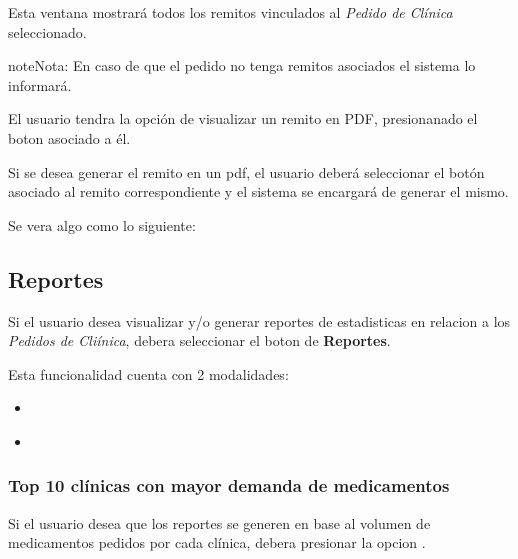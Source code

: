 \documentclass[a4paper,10pt,spanish]{sphinxmanual}
\begin{document}
Esta ventana mostrará todos los remitos vinculados al \emph{Pedido de Clínica} seleccionado.

\begin{notice}{note}{Nota:}
En caso de que el pedido no tenga remitos asociados el sistema lo informará.
\end{notice}

El usuario tendra la opción de visualizar un remito en PDF, presionanado el boton  asociado a él.

Si se desea generar el remito en un pdf, el usuario deberá seleccionar el botón asociado al remito correspondiente y el sistema se encargará de generar el mismo.

Se vera algo como lo siguiente:



\subsection{Reportes}
\label{pedidosclinica:reportes}\label{pedidosclinica:reportes-pc}
Si el usuario desea visualizar y/o generar reportes de estadisticas en relacion a los \emph{Pedidos de Cliínica}, debera seleccionar el boton de \textbf{Reportes}.


Esta funcionalidad cuenta con 2 modalidades:
\begin{itemize}
\item {} 
{\hyperref[pedidosclinica:top10\string-meds\string-pc]{}}

\item {} 
{\hyperref[pedidosclinica:top10\string-peds\string-pc]{}}

\end{itemize}


\subsubsection{Top 10 clínicas con mayor demanda de medicamentos}
\label{pedidosclinica:top10-meds-pc}\label{pedidosclinica:top-10-clinicas-con-mayor-demanda-de-medicamentos}
Si el usuario desea que los reportes se generen en base al volumen de medicamentos pedidos por cada clínica, debera presionar la opcion .
\end{document}
